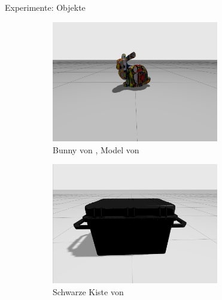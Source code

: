 \documentclass{beamer}
\begin{document}

\begin{frame}{Experimente: Objekte}

	\begin{figure}[h]
		\centering
		\begin{subfigure}{0.45\textwidth}
			\centering
			\includegraphics[width=0.8\textwidth]{Graphics/bunny.png}
			\caption{Bunny von \cite{noauthor_stanford_nodate}, Model von \cite{delmerico_comparison_2018}}
		\end{subfigure}
		\begin{subfigure}{0.45\textwidth}
			\centering
			\includegraphics[width=0.8\textwidth]{Graphics/crate}
			\caption{Schwarze Kiste von \cite{GazeboFuel-OpenRobotics-Large-Crate}}
		\end{subfigure}
		\vspace{0.5cm}
		\begin{subfigure}{0.45\textwidth}

\end{subfigure}
\end{figure}
\end{frame}
\end{document}
